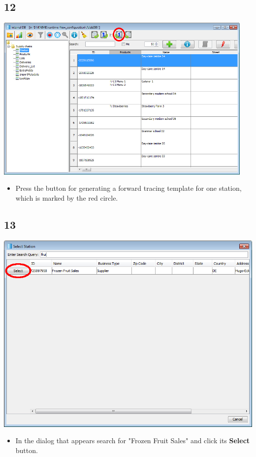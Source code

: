 \documentclass{beamer}
\begin{document}
\subsection{12}
\begin{frame}
	\begin{center}
  		\includegraphics[width=0.95\textwidth]{12.png}
	\end{center}
	\begin{itemize}
		\item Press the button for generating a forward tracing template for one station, which is marked by the red circle.
	\end{itemize}
\end{frame}

\subsection{13}
\begin{frame}
	\begin{center}
  		\includegraphics[height=0.6\textheight]{13.png}
	\end{center}
	\begin{itemize}
		\item In the dialog that appears search for "Frozen Fruit Sales" and click its \textbf{Select} button.
	\end{itemize}
\end{frame}
\end{document}
